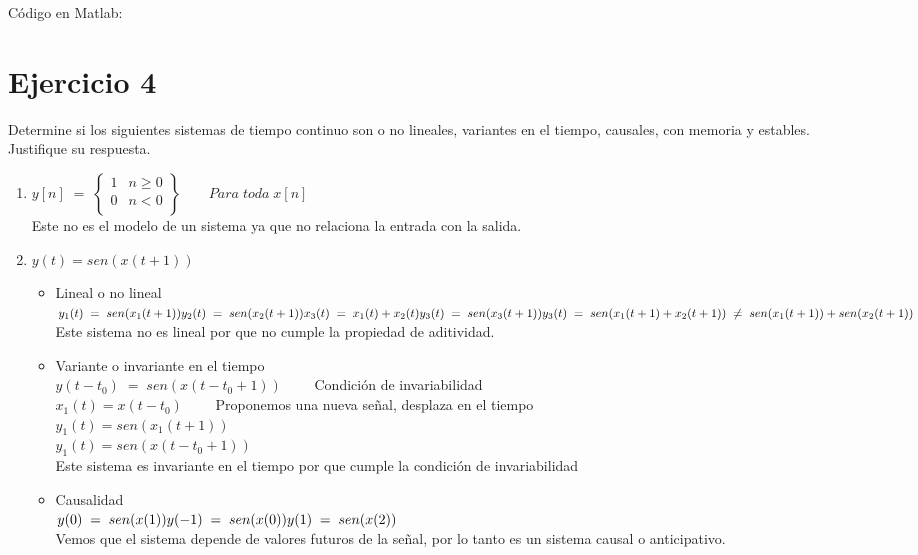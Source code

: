 \documentclass[10pt,a4paper]{report}
\begin{document}
\begin{enumerate}
Código en Matlab:
    
    
\end{enumerate}

\section{Ejercicio 4}
Determine si los siguientes sistemas de tiempo continuo son o no lineales, variantes en el tiempo, causales, con memoria y estables. Justifique su respuesta.
\begin{enumerate}
  \item  $ y\left[n\right]\;=\;\left\{\begin{array}{lc}
                                     1&n\geq0 \\
                                     0&n<0 \\ 
                                   \end{array}\right\} \qquad Para\;toda\;x\left[n\right]
$\\
Este no es el modelo de un sistema ya que no relaciona la entrada con la salida.
  \item $y(t)=sen(x(t+1)) $
  \begin{itemize}
    \item Lineal o no lineal\\
$ y_1(t)\;=\;sen(x_1(t+1))\\
  y_2(t)\;=\;sen(x_2(t+1))\\
  x_3(t)\;=\;x_1(t)+x_2(t)\\
  y_3(t)\;=\;sen(x_3(t+1))\\
  y_3(t)\;=\;sen(x_1(t+1)+x_2(t+1))\;\neq\;sen(x_1(t+1))+sen(x_2(t+1))
$\\
  \newline Este sistema no es lineal por que no cumple la propiedad de aditividad.

  \item Variante o invariante en el tiempo\\
$ y(t-t_0)\;=\;sen(x(t-t_0+1)) \qquad $ Condición de invariabilidad\\
$ x_1(t)=x(t-t_0) \qquad $ Proponemos una nueva señal, desplaza en el tiempo \\ 
$ y_1(t)=sen(x_1(t+1)) $\\
$ y_1(t)=sen(x(t-t_0+1)) $\\
  \newline  
  Este sistema es invariante en el tiempo por que cumple la condición de invariabilidad\\
  \newline
  \item Causalidad\\
$y(0)\;=\;sen(x(1))\\
y(-1)\;=\;sen(x(0))\\
y(1)\;=\;sen(x(2))$\\
  \newline
Vemos que el sistema depende de valores futuros de la señal, por lo tanto es un sistema causal o anticipativo.\\


\end{itemize}
\end{enumerate}
\end{document}
